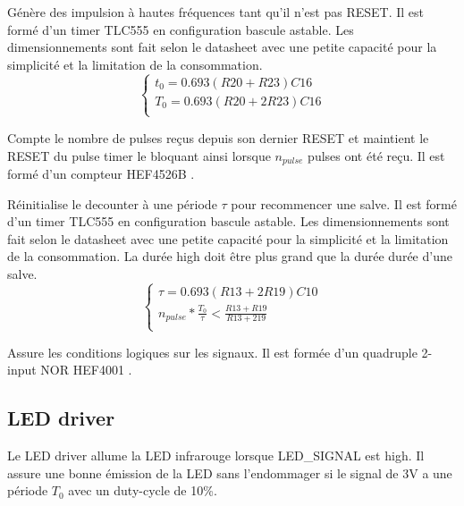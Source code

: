\documentclass[french]{layout/Report}
\begin{document}
\begin{description}[leftmargin=!,labelwidth=3cm, labelindent=\parindent]
	\item[Pulse timer] Génère des impulsion à hautes fréquences tant qu'il n'est pas RESET. Il est formé d'un timer TLC555 en configuration bascule astable. Les dimensionnements sont fait selon le datasheet \cite{TLC555} avec une petite capacité pour la simplicité et la limitation de la consommation.
		\begin{equation*}
			\begin{cases}
				t_0 = 0.693(\mathit{R20}+\mathit{R23})\mathit{C16} \\
				T_0 = 0.693(\mathit{R20}+2\mathit{R23})\mathit{C16} \\
			\end{cases}
		\end{equation*}
	\item[Down counter] Compte le nombre de pulses reçus depuis son dernier RESET et maintient le RESET du pulse timer le bloquant ainsi lorsque $n_{pulse}$ pulses ont été reçu. Il est formé d'un compteur HEF4526B \cite{HEF4526B}.
	\item[Burst timer] Réinitialise le decounter à une période $\tau$ pour recommencer une salve. Il est formé d'un timer TLC555 en configuration bascule astable. Les dimensionnements sont fait selon le datasheet \cite{TLC555} avec une petite capacité pour la simplicité et la limitation de la consommation. La durée high doit être plus grand que la durée durée d'une salve.
		\begin{equation*}
			\begin{cases}
				\tau = 0.693(\mathit{R13}+2\mathit{R19})\mathit{C10} \\
				n_{pulse}*\frac{T_0}{\tau} < \frac{\mathit{R13}+\mathit{R19}}{\mathit{R13}+2\mathit{19}} \\
			\end{cases}
		\end{equation*}
	\item[Logic] Assure les conditions logiques sur les signaux. Il est formée d'un quadruple 2-input NOR HEF4001 \cite{HEF4001B}.
\end{description}

\subsection{LED driver}
\label{subsec:LED_driver}
Le LED driver allume la LED infrarouge lorsque LED\_SIGNAL est high. Il assure une bonne émission de la LED sans l'endommager si le signal de 3V a une période $T_0$ avec un duty-cycle de 10\%.
\end{document}

